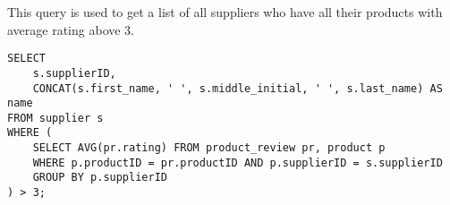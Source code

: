 This query is used to get a list of all suppliers who have all their products with average rating above 3.

\begin{lstlisting}
SELECT
    s.supplierID,
    CONCAT(s.first_name, ' ', s.middle_initial, ' ', s.last_name) AS name
FROM supplier s
WHERE (
    SELECT AVG(pr.rating) FROM product_review pr, product p
    WHERE p.productID = pr.productID AND p.supplierID = s.supplierID
    GROUP BY p.supplierID
) > 3;
\end{lstlisting}